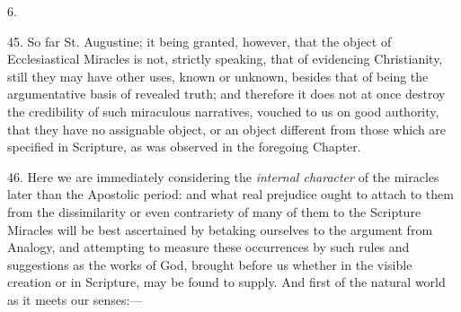6.

45.
So far St. Augustine; it being granted, however, that the object of
Ecclesiastical Miracles is not, strictly speaking, that of evidencing
Christianity, still they may have other uses, known or unknown,
besides that of being the argumentative basis of revealed truth; and
therefore it does not at once destroy the credibility of such
miraculous narratives, vouched to us on good authority, that they have
no assignable object, or an object different from those which are
specified in Scripture, as was observed in the foregoing Chapter.

46.
Here we are immediately considering the \emph{internal character} of
the miracles later than the Apostolic period: and what real prejudice
ought to attach to them from the dissimilarity or even contrariety of
many of them to the Scripture Miracles will be best ascertained by
betaking ourselves to the argument from Analogy, and attempting to
measure these occurrences by such rules and suggestions as the works
of God, brought before us whether in the visible creation or in
Scripture, may be found to supply. And first of the natural world as
it meets our senses:—

